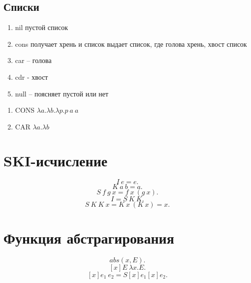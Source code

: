 \documentclass[14pt]{extarticle}
\begin{document}
\subsection{Списки}
\begin{enumerate}
    \item nil пустой список
    \item cons получает хрень и список выдает список, где голова хрень, хвост список
    \item car -- голова
    \item cdr - хвост
    \item null -- поясняет пустой или нет
\end{enumerate}
\begin{enumerate}
    \item CONS  $\lambda a . \lambda b . \lambda p . p ~ a ~ a$
    \item CAR  $\lambda a . \lambda b $
\end{enumerate}
\section{SKI-исчисление}
\[
I ~ e = e
.\] 
\[
K ~ a ~ b = a
.\] 
\[
S ~ f ~ g ~ x = f ~ x ~ (g ~ x)
.\] 
\[
I = S ~ K ~ K
.\] 
\[
S ~ K ~ K ~  x = K ~ x ~ (K ~ x) = x
.\] 
\section{Функция абстрагирования}
\[
abs(x,E)
.\] 
\[
    [x] E ~ \lambda x.E
.\] 
\[
    [x] e_1 ~ e_2 = S [x] e_1 [x] e_2
.\] 
\end{document}
